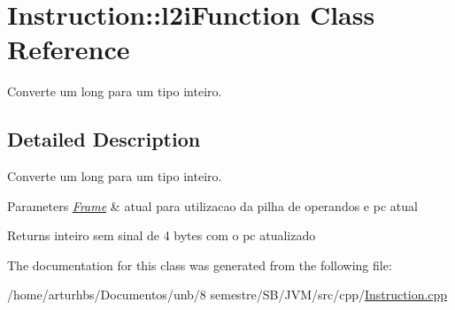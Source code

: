 \hypertarget{classInstruction_1_1l2iFunction}{}\section{Instruction\+:\+:l2i\+Function Class Reference}
\label{classInstruction_1_1l2iFunction}


Converte um long para um tipo inteiro.  




\subsection{Detailed Description}
Converte um long para um tipo inteiro. 


\begin{DoxyParams}{Parameters}
{\em \hyperlink{classFrame}{Frame}} & atual para utilizacao da pilha de operandos e pc atual \\
\hline
\end{DoxyParams}
\begin{DoxyReturn}{Returns}
inteiro sem sinal de 4 bytes com o pc atualizado 
\end{DoxyReturn}


The documentation for this class was generated from the following file\+:\begin{DoxyCompactItemize}
\item 
/home/arturhbs/\+Documentos/unb/8 semestre/\+S\+B/\+J\+V\+M/src/cpp/\hyperlink{Instruction_8cpp}{Instruction.\+cpp}\end{DoxyCompactItemize}
